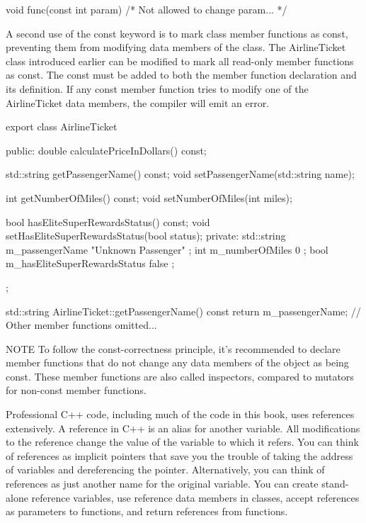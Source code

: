 \begin{cpp}
void func(const int param) { /* Not allowed to change param... */ }
\end{cpp}


A second use of the const keyword is to mark class member functions as const, preventing them from modifying data members of the class. The AirlineTicket class introduced earlier can be modified to mark all read-only member functions as const. The const must be added to both the member function declaration and its definition. If any const member function tries to modify one of the AirlineTicket data members, the compiler will emit an error.

\begin{cpp}
export class AirlineTicket
{
    public:
        double calculatePriceInDollars() const;

        std::string getPassengerName() const;
        void setPassengerName(std::string name);

        int getNumberOfMiles() const;
        void setNumberOfMiles(int miles);

        bool hasEliteSuperRewardsStatus() const;
        void setHasEliteSuperRewardsStatus(bool status);
    private:
        std::string m_passengerName { "Unknown Passenger" };
        int m_numberOfMiles { 0 };
        bool m_hasEliteSuperRewardsStatus { false };
};

std::string AirlineTicket::getPassengerName() const
{
    return m_passengerName;
}
// Other member functions omitted...
\end{cpp}

\begin{myNotic}{NOTE}
To follow the const-correctness principle, it’s recommended to declare member functions that do not change any data members of the object as being const. These member functions are also called inspectors, compared to mutators for non-const member functions.
\end{myNotic}


Professional C++ code, including much of the code in this book, uses references extensively. A reference in C++ is an alias for another variable. All modifications to the reference change the value of the variable to which it refers. You can think of references as implicit pointers that save you the trouble of taking the address of variables and dereferencing the pointer. Alternatively, you can think of references as just another name for the original variable. You can create stand-alone reference variables, use reference data members in classes, accept references as parameters to functions, and return references from functions.

